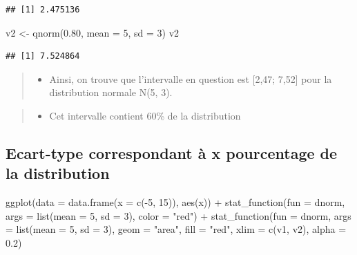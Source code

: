 \documentclass[
]{article}
\newenvironment{Shaded}{\begin{snugshade}}{\end{snugshade}}
\newcommand{\AttributeTok}[1]{\textcolor[rgb]{0.77,0.63,0.00}{#1}}
\newcommand{\DecValTok}[1]{\textcolor[rgb]{0.00,0.00,0.81}{#1}}
\newcommand{\FloatTok}[1]{\textcolor[rgb]{0.00,0.00,0.81}{#1}}
\newcommand{\FunctionTok}[1]{\textcolor[rgb]{0.00,0.00,0.00}{#1}}
\newcommand{\NormalTok}[1]{#1}
\newcommand{\OtherTok}[1]{\textcolor[rgb]{0.56,0.35,0.01}{#1}}
\newcommand{\SpecialCharTok}[1]{\textcolor[rgb]{0.00,0.00,0.00}{#1}}
\newcommand{\StringTok}[1]{\textcolor[rgb]{0.31,0.60,0.02}{#1}}
\providecommand{\tightlist}{%
  \setlength{\itemsep}{0pt}\setlength{\parskip}{0pt}}
\begin{document}
\begin{verbatim}
## [1] 2.475136
\end{verbatim}

\begin{Shaded}
\begin{Highlighting}[]
\NormalTok{v2 }\OtherTok{\textless{}{-}} \FunctionTok{qnorm}\NormalTok{(}\FloatTok{0.80}\NormalTok{, }\AttributeTok{mean =} \DecValTok{5}\NormalTok{, }\AttributeTok{sd =} \DecValTok{3}\NormalTok{)}
\NormalTok{v2}
\end{Highlighting}
\end{Shaded}

\begin{verbatim}
## [1] 7.524864
\end{verbatim}

\begin{quote}
\begin{itemize}
\tightlist
\item
  Ainsi, on trouve que l'intervalle en question est {[}2,47; 7,52{]}
  pour la distribution normale N(5, 3).
\end{itemize}
\end{quote}

\begin{quote}
\begin{itemize}
\tightlist
\item
  Cet intervalle contient 60\% de la distribution
\end{itemize}
\end{quote}

\hypertarget{ecart-type-correspondant-uxe0-x-pourcentage-de-la-distribution-2}{%
\subsection{Ecart-type correspondant à x pourcentage de la
distribution}\label{ecart-type-correspondant-uxe0-x-pourcentage-de-la-distribution-2}}

\begin{Shaded}
\begin{Highlighting}[]
\FunctionTok{ggplot}\NormalTok{(}\AttributeTok{data =} \FunctionTok{data.frame}\NormalTok{(}\AttributeTok{x =} \FunctionTok{c}\NormalTok{(}\SpecialCharTok{{-}}\DecValTok{5}\NormalTok{, }\DecValTok{15}\NormalTok{)), }\FunctionTok{aes}\NormalTok{(x)) }\SpecialCharTok{+}
  \FunctionTok{stat\_function}\NormalTok{(}\AttributeTok{fun =}\NormalTok{ dnorm, }\AttributeTok{args =} \FunctionTok{list}\NormalTok{(}\AttributeTok{mean =} \DecValTok{5}\NormalTok{, }\AttributeTok{sd =} \DecValTok{3}\NormalTok{), }\AttributeTok{color =} \StringTok{"red"}\NormalTok{) }\SpecialCharTok{+}
  \FunctionTok{stat\_function}\NormalTok{(}\AttributeTok{fun =}\NormalTok{ dnorm, }\AttributeTok{args =} \FunctionTok{list}\NormalTok{(}\AttributeTok{mean =} \DecValTok{5}\NormalTok{, }\AttributeTok{sd =} \DecValTok{3}\NormalTok{),}
                \AttributeTok{geom =} \StringTok{"area"}\NormalTok{, }\AttributeTok{fill =} \StringTok{"red"}\NormalTok{, }\AttributeTok{xlim =} \FunctionTok{c}\NormalTok{(v1, v2), }\AttributeTok{alpha =} \FloatTok{0.2}\NormalTok{)}
\end{Highlighting}
\end{Shaded}
\end{document}
